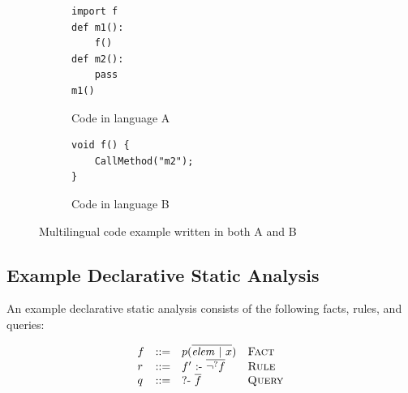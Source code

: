 \begin{figure}[t]
  \centering
  \begin{subfigure}[t]{0.3\textwidth}
    \begin{lstlisting}[style=mpython]
import f
def m1():
    f()
def m2():
    pass
m1()
    \end{lstlisting}
    \vspace*{-.5em}
    \caption{Code in language A}
    \label{fig:exam:langA}
  \end{subfigure}
  \begin{subfigure}[t]{0.3\textwidth}
    \begin{lstlisting}[style=mcpp,firstnumber=7]
void f() {
    CallMethod("m2");
}
    \end{lstlisting}
    \vspace*{3.3em}
    \caption{Code in language B}
    \label{fig:exam:langB}
  \end{subfigure}
  \vspace*{-.5em}
  \caption{Multilingual code example written in both A and B}
  \label{fig:exam}
\end{figure}

%

\subsection{Example Declarative Static Analysis}
An example declarative static analysis consists of the following facts, rules, and queries:

\[
  \begin{array}{llll}
    f & ::= & p(\overline{\mbox{\textit{elem}}\ |\ x}) & \text{\sc Fact}\\
    r & ::= & f'\ \mbox{:-}\ \overline{\neg^? f} & \text{\sc Rule}\\
    q & ::= & \mbox{?-}\ \overline{f}\ &  \text{\sc Query}
\end{array}
\]

